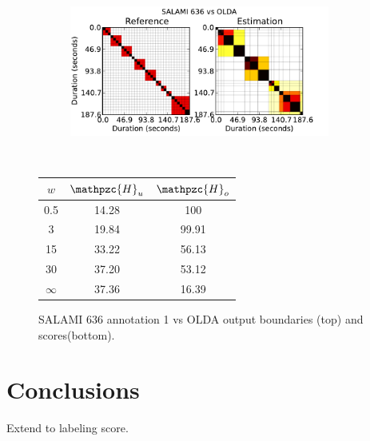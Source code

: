\documentclass{article}
\def\shag{\ensuremath{\mathpzc{H}}}
\begin{document}
\begin{figure}[t]
  \centering
  \begin{subfigure}{0.5\textwidth}
    \centering
    \includegraphics[width=0.94\textwidth]{plots/SALAMI-OLDA.pdf}
  \end{subfigure}%
  \\
  \begin{minipage}{0.5\textwidth}
    \centering
    \vspace{10pt}
    \begin{tabular}{|c|c|c|}
      \hline
      $w$       & $\shag_u$       & $\shag_o$      \\
      \hline
      0.5       & 14.28       & 100      \\     
      3         & 19.84       & 99.91      \\
      15        & 33.22       & 56.13    \\
      30        & 37.20       & 53.12    \\
      $\infty$  & 37.36       & 16.39    \\
      \hline
    \end{tabular}
  \end{minipage}
  \caption{SALAMI 636 annotation 1 vs OLDA output boundaries (top) and scores(bottom).}
  \label{fig:SALAMI-OLDA}
\end{figure}




\section{Conclusions}\label{sec:conclusions}

Extend to labeling score.



%
\end{document}
